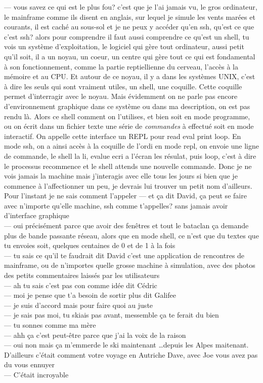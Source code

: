\documentclass{article}
\begin{document}
--- vous savez ce qui est le plus fou? c'est que je l'ai jamais vu, le gros
ordinateur, le mainframe comme ils disent en anglais, sur lequel je simule les
vents marées et courants, il est caché au sous-sol et je ne peux y accéder qu'en
ssh, qu'est ce que c'est ssh? alors pour comprendre il faut aussi comprendre ce
qu'est un shell, tu vois un système d'exploitation, le logiciel qui gère tout
ordinateur, aussi petit qu'il soit, il a un noyau, un coeur, un centre qui gère
tout ce qui est fondamental à son fonctionnement, comme la partie reptiellienne
du cerveau, l'accès à la mémoire et au CPU. Et autour de ce noyau, il y a dans
les systèmes UNIX, c'est à dire les seuls qui sont vraiment utiles, un shell,
une coquille. Cette coquille permet d'interragir avec le noyau. Mais évidemment
on ne parle pas encore d'environnement graphique dans ce système ou dans ma
description, on est pas rendu là. Alors ce shell comment on l'utilises, et bien
soit en mode programme, ou on écrit dans un fichier texte une série de
\emph{commandes} à effectué soit en mode interactif. On appelle cette interface
un REPL pour read eval print loop. En mode ssh, on a ainsi accès à la coquille
de l'ordi en mode repl, on envoie une ligne de commande, le shell la li, evalue
ecri a l'écran les résulat, puis loop, c'est à dire le processus recommence et
le shell attends une nouvelle commande. Donc je ne vois jamais la machine mais
j'interagis avec elle tous les jours si bien que je commence à l'affectionner un
peu, je devrais lui trouver un petit nom d'ailleurs. Pour l'instant je ne sais
comment l'appeler
--- et ça dit David, ça peut se faire avec n'importe qu'elle machine, ssh comme
t'appelles? sans jamais avoir d'interface graphique\\
--- oui précisément parce que avoir des fenêtres et tout le bataclan ça demande
plus de bande passante réseau, alors que en mode shell, ce n'est que du textes
que tu envoies soit, quelques centaines de 0 et de 1 à la fois\\
--- tu sais ce qu'il te faudrait dit David c'est une application de rencontres
de mainframe, ou de n'importes quelle grosse machine à simulation, avec des photos
des petits commentaires laissés par les utilisateurs\\
--- ah tu sais c'est pas con comme idée dit Cédric\\
--- moi je pense que t'a besoin de sortir plus dit Galifee\\
--- je suis d'accord mais pour faire quoi au juste\\
--- je sais pas moi, tu skiais pas avant, messemble ça te ferait du bien\\
--- tu sonnes comme ma mère\\
--- ahh ça c'est peut-être parce que j'ai la voix de la raison\\
--- oui non mais ça m'emmerde le ski maintenant \ldots depuis les Alpes maitenant.
D'ailleurs c'était comment votre voyage en Autriche Dave, avec Joe vous avez pas du vous
ennuyer\\
--- C'était incroyable\\
\end{document}
